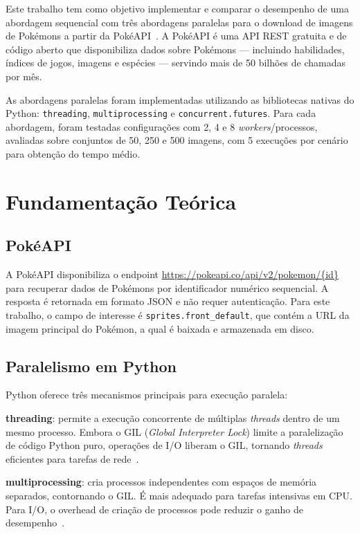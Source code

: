 \documentclass[12pt]{article}
\begin{document}
Este trabalho tem como objetivo implementar e comparar o desempenho de uma
abordagem sequencial com três abordagens paralelas para o download de imagens de
Pokémons a partir da PokéAPI~\cite{pokeapi}. A PokéAPI é uma API REST gratuita
e de código aberto que disponibiliza dados sobre Pokémons — incluindo habilidades,
índices de jogos, imagens e espécies — servindo mais de 50 bilhões de chamadas
por mês.

As abordagens paralelas foram implementadas utilizando as bibliotecas nativas do
Python: \texttt{threading}, \texttt{multiprocessing} e \texttt{concurrent.futures}.
Para cada abordagem, foram testadas configurações com 2, 4 e 8
\textit{workers}/processos, avaliadas sobre conjuntos de 50, 250 e 500
imagens, com 5 execuções por cenário para obtenção do tempo médio.


\section{Fundamentação Teórica}

\subsection{PokéAPI}

A PokéAPI disponibiliza o endpoint \url{https://pokeapi.co/api/v2/pokemon/\{id\}}
para recuperar dados de Pokémons por identificador numérico sequencial. A resposta
é retornada em formato JSON e não requer autenticação. Para este trabalho, o campo
de interesse é \texttt{sprites.front\_default}, que contém a URL da imagem
principal do Pokémon, a qual é baixada e armazenada em disco.

\subsection{Paralelismo em Python}

Python oferece três mecanismos principais para execução paralela:

\textbf{threading}: permite a execução concorrente de múltiplas \textit{threads}
dentro de um mesmo processo. Embora o GIL (\textit{Global Interpreter Lock})
limite a paralelização de código Python puro, operações de I/O liberam o GIL,
tornando \textit{threads} eficientes para tarefas de rede~\cite{python-threading}.

\textbf{multiprocessing}: cria processos independentes com espaços de memória
separados, contornando o GIL. É mais adequado para tarefas intensivas em CPU.
Para I/O, o overhead de criação de processos pode reduzir o ganho de
desempenho~\cite{python-multiprocessing}.
\end{document}
